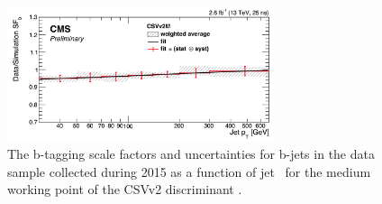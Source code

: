 \begin{figure}[h!]
\includegraphics[width=0.7\textwidth]{./Objects/Plots/CSVSF.png}
\caption[The b-tagging scale factors and uncertainties for b-jets in the data sample collected during 2015 as a function of jet \pT~for the medium working point of the CSVv2 discriminant.]{%
The b-tagging scale factors and uncertainties for b-jets in the data sample collected during 2015
as a function of jet \pT~for the medium working point of the CSVv2 discriminant \cite{cms-btag-run2}.}
\label{fig:objects_bjets}
\end{figure}

